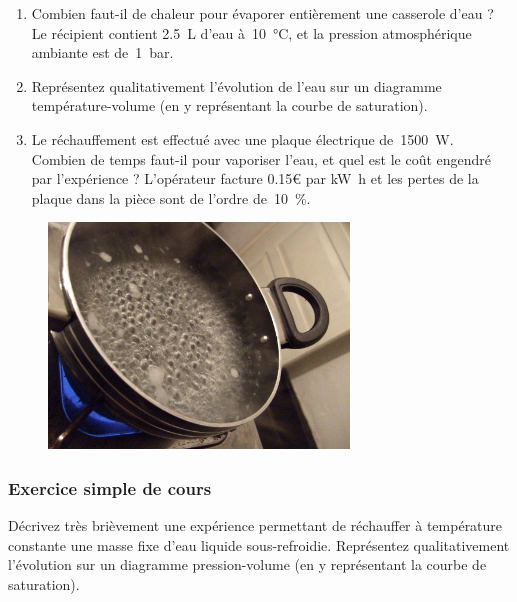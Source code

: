 	\begin{enumerate}
		\item Combien faut-il de chaleur pour évaporer entièrement une casserole d’eau ? Le récipient contient \SI{2.5}{\liter} d’eau à~\SI{10}{\degreeCelsius}, et la pression atmosphérique ambiante est de~\SI{1}{\bar}. 
		\item Représentez qualitativement l’évolution de l’eau sur un diagramme température-volume (en y représentant la courbe de saturation).
		\item Le réchauffement est effectué avec une plaque électrique de~\SI{1500}{\watt}. Combien de temps faut-il pour vaporiser l’eau, et quel est le coût engendré par l’expérience ? L’opérateur facture \num{0,15}\euro{} par \si{\kilo\watt\hour} et les pertes de la plaque dans la pièce sont de l’ordre de~\SI{10}{\percent}. 
	\end{enumerate}

	\begin{figure}[htp] %
		\begin{center}
			\includegraphics[width=8cm]{images/exercice_boiling.jpg}
		\end{center}
	\end{figure}

\subsubsection{Exercice simple de cours}

	\begin{samepage}
	Décrivez très brièvement une expérience permettant de réchauffer à température constante une masse fixe d’eau liquide sous-refroidie. Représentez qualitativement l’évolution sur un diagramme pression-volume (en y représentant la courbe de saturation).
	\end{samepage} %


